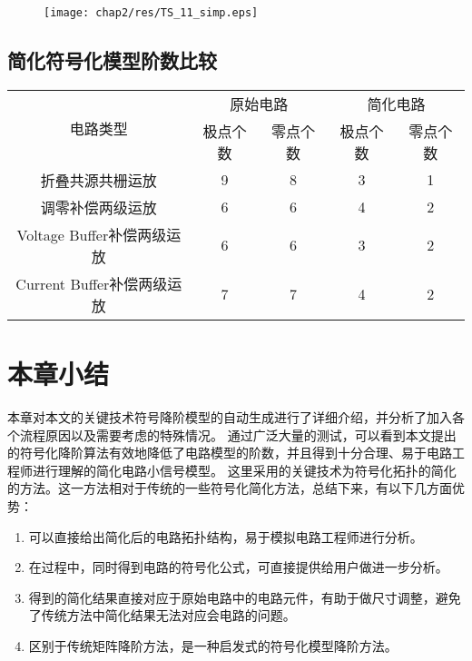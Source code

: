 \begin{figure}[!htp]
	\centering
	\texttt{[image: chap2/res/TS\_11\_simp.eps]}
\end{figure}

\subsection{简化符号化模型阶数比较}
\label{subsec:simp:res:order}

\begin{table}[!htbp]
	\centering
	\begin{tabular}{c|c|c|c|c}
		\hline
		\multirow{2}{*}{电路类型} & \multicolumn{2}{c|}{原始电路} & \multicolumn{2}{c}{简化电路} \\ \cline{2-5}
		                      & 极点个数 &        零点个数        & 极点个数 &       零点个数        \\ \hline
		      折叠共源共栅运放        &  9   &         8          &  3   &         1         \\
		      调零补偿两级运放        &  6   &         6          &  4   &         2         \\
		Voltage Buffer补偿两级运放  &  6   &         6          &  3   &         2         \\
		Current Buffer补偿两级运放  &  7   &         7          &  4   &         2         \\ \hline
	\end{tabular}
\end{table}

\section{本章小结}
\label{sec:simp:con}

本章对本文的关键技术符号降阶模型的自动生成进行了详细介绍，并分析了加入各个流程原因以及需要考虑的特殊情况。
通过广泛大量的测试，可以看到本文提出的符号化降阶算法有效地降低了电路模型的阶数，并且得到十分合理、易于电路工程师进行理解的简化电路小信号模型。
这里采用的关键技术为符号化拓扑的简化的方法。这一方法相对于传统的一些符号化简化方法，总结下来，有以下几方面优势：

\begin{enumerate}[label=\emph{\alph*})]
	\item 可以直接给出简化后的电路拓扑结构，易于模拟电路工程师进行分析。
	\item 在过程中，同时得到电路的符号化公式，可直接提供给用户做进一步分析。
	\item 得到的简化结果直接对应于原始电路中的电路元件，有助于做尺寸调整，避免了传统方法中简化结果无法对应会电路的问题。
	\item 区别于传统矩阵降阶方法，是一种启发式的符号化模型降阶方法。
\end{enumerate}